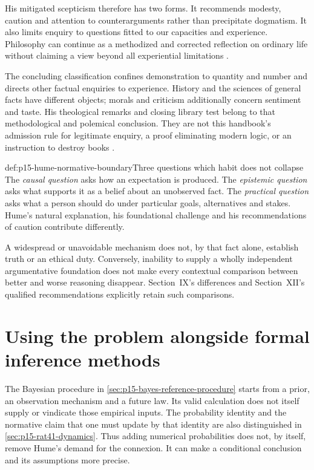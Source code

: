 His mitigated scepticism therefore has two forms. It recommends
modesty, caution and attention to counterarguments rather than
precipitate dogmatism. It also limits enquiry to questions fitted
to our capacities and experience. Philosophy can continue as a
methodized and corrected reflection on ordinary life without
claiming a view beyond all experiential limitations
\parencite[E~12.23--12.26]{Hume1777EnquiryHTO}.

The concluding classification confines demonstration to quantity
and number and directs other factual enquiries to experience.
History and the sciences of general facts have different objects;
morals and criticism additionally concern sentiment and taste.
His theological remarks and closing library test belong to that
methodological and polemical conclusion. They are not this handbook's
admission rule for legitimate enquiry, a proof eliminating modern
logic, or an instruction to destroy books
\parencite[E~12.27--12.34, 12.29n35]{Hume1777EnquiryHTO}.

\begin{hbwarning}{def:p15-hume-normative-boundary}{Three questions which habit does not collapse}
The \emph{causal question} asks how an expectation is produced.
The \emph{epistemic question} asks what supports it as a belief
about an unobserved fact. The \emph{practical question} asks
what a person should do under particular goals, alternatives and
stakes. Hume's natural explanation, his foundational challenge
and his recommendations of caution contribute differently.

A widespread or unavoidable mechanism does not, by that fact
alone, establish truth or an ethical duty. Conversely, inability
to supply a wholly independent argumentative foundation does not
make every contextual comparison between better and worse
reasoning disappear. Section~IX's differences and Section~XII's
qualified recommendations explicitly retain such comparisons.
\end{hbwarning}

\section{Using the problem alongside formal inference methods}
\label{sec:p15-hume-reference-use}

The Bayesian procedure in \cref{sec:p15-bayes-reference-procedure}
starts from a prior, an observation mechanism and a future law.
Its valid calculation does not itself supply or vindicate those
empirical inputs. The probability identity and the normative
claim that one must update by that identity are also distinguished
in \cref{sec:p15-rat41-dynamics}. Thus adding numerical probabilities
does not, by itself, remove Hume's demand for the connexion.
It can make a conditional conclusion and its assumptions more precise.


